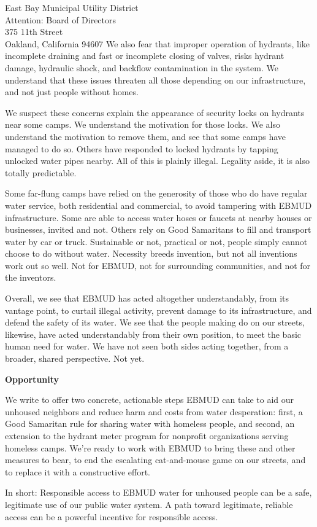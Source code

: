 \documentclass[letterpaper]{letter}
\begin{document}
\begin{letter}{%
    East Bay Municipal Utility District\\
    Attention: Board of Directors\\
    375 11th Street\\
    Oakland, California 94607}
    We also fear that improper operation of hydrants, like incomplete draining and fast or incomplete closing of valves, risks hydrant damage, hydraulic shock, and backflow contamination in the system. We understand that these issues threaten all those depending on our infrastructure, and not just people without homes.

    We suspect these concerns explain the appearance of security locks on hydrants near some camps. We understand the motivation for those locks. We also understand the motivation to remove them, and see that some camps have managed to do so. Others have responded to locked hydrants by tapping unlocked water pipes nearby. All of this is plainly illegal. Legality aside, it is also totally predictable.

    Some far-flung camps have relied on the generosity of those who do have regular water service, both residential and commercial, to avoid tampering with EBMUD infrastructure. Some are able to access water hoses or faucets at nearby houses or businesses, invited and not. Others rely on Good Samaritans to fill and transport water by car or truck. Sustainable or not, practical or not, people simply cannot choose to do without water. Necessity breeds invention, but not all inventions work out so well. Not for EBMUD, not for surrounding communities, and not for the inventors.

    Overall, we see that EBMUD has acted altogether understandably, from its vantage point, to curtail illegal activity, prevent damage to its infrastructure, and defend the safety of its water. We see that the people making do on our streets, likewise, have acted understandably from their own position, to meet the basic human need for water. We have not seen both sides acting together, from a broader, shared perspective. Not yet.

    \stopbreaks
    \textbf{Opportunity}

    We write to offer two concrete, actionable steps EBMUD can take to aid our unhoused neighbors and reduce harm and costs from water desperation: first, a Good Samaritan rule for sharing water with homeless people, and second, an extension to the hydrant meter program for nonprofit organizations serving homeless camps. We’re ready to work with EBMUD to bring these and other measures to bear, to end the escalating cat-and-mouse game on our streets, and to replace it with a constructive effort.
    \startbreaks

    In short: Responsible access to EBMUD water for unhoused people can be a safe, legitimate use of our public water system. A path toward legitimate, reliable access can be a powerful incentive for responsible access.


\end{letter}
\end{document}

